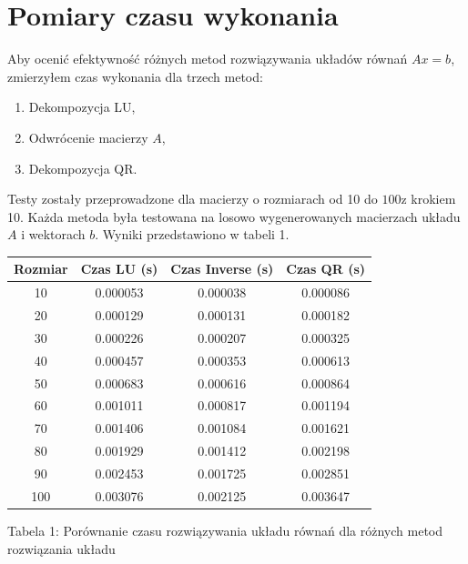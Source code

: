 \documentclass[10pt]{article}
\begin{document}
\section*{Pomiary czasu wykonania}
Aby ocenić efektywność różnych metod rozwiązywania układów równań $A x=b$, zmierzyłem czas wykonania dla trzech metod:

\begin{enumerate}
  \item Dekompozycja LU,

  \item Odwrócenie macierzy $A$,

  \item Dekompozycja QR.

\end{enumerate}

Testy zostały przeprowadzone dla macierzy o rozmiarach od 10 do $100 \mathrm{z}$ krokiem 10. Każda metoda była testowana na losowo wygenerowanych macierzach układu $A$ i wektorach $b$. Wyniki przedstawiono w tabeli 1.

\begin{center}
\begin{tabular}{|c|c|c|c|}
\hline
Rozmiar & Czas LU (s) & Czas Inverse (s) & Czas QR (s) \\
\hline
10 & 0.000053 & 0.000038 & 0.000086 \\
20 & 0.000129 & 0.000131 & 0.000182 \\
30 & 0.000226 & 0.000207 & 0.000325 \\
40 & 0.000457 & 0.000353 & 0.000613 \\
50 & 0.000683 & 0.000616 & 0.000864 \\
60 & 0.001011 & 0.000817 & 0.001194 \\
70 & 0.001406 & 0.001084 & 0.001621 \\
80 & 0.001929 & 0.001412 & 0.002198 \\
90 & 0.002453 & 0.001725 & 0.002851 \\
100 & 0.003076 & 0.002125 & 0.003647 \\
\hline
\end{tabular}
\end{center}

Tabela 1: Porównanie czasu rozwiązywania układu równań dla różnych metod rozwiązania układu
\end{document}
